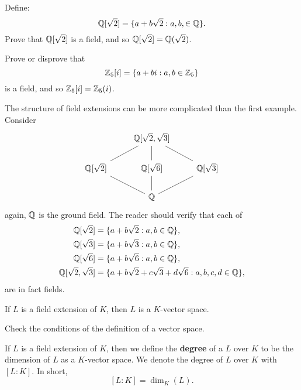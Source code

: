 \documentclass{ximera}
\begin{document}
\begin{exercise}
  Define:
  \[
  \mathbb Q[\sqrt{2}] = \{ a+ b\sqrt{2}: a,b,\in\mathbb Q\}.
  \]
  Prove that $\mathbb Q[\sqrt{2}]$ is a field, and so $\mathbb Q[\sqrt{2}] = \mathbb Q(\sqrt{2})$.
\end{exercise}

\begin{exercise}
  Prove or disprove that
  \[
  \mathbb Z_5[i] = \{a + b i: a,b\in\mathbb Z_5\}
  \]
  is a field, and so $\mathbb Z_5[i] = \mathbb Z_5(i)$.
\end{exercise}


\begin{example}
  The structure of field extensions can be more complicated than the
  first example. Consider
  \[
  \begin{tikzcd}
    & \Q[\sqrt{2},\sqrt{3}]\ar[rd,-] \ar[d,-] \ar[ld,-]& \\
    \Q[\sqrt{2}] \ar[rd,-]& \Q[\sqrt{6}] \ar[d,-]& \Q[\sqrt{3}]\ar[ld,-]\\
    &  \Q & 
  \end{tikzcd}
  \]
  again, $\mathbb Q$ is the ground field.  The reader should verify that each
  of
  \begin{align*}
    \mathbb Q[\sqrt{2}] &=\{a + b\sqrt{2}: a,b\in \mathbb Q\},\\
    \mathbb Q[\sqrt{3}] &=\{a + b\sqrt{3}: a,b\in \mathbb Q\},\\
    \mathbb Q[\sqrt{6}] &=\{a + b\sqrt{6}: a,b\in \mathbb Q\},\\
    \mathbb Q[\sqrt{2},\sqrt{3}] &=\{a + b\sqrt{2} + c\sqrt{3} + d\sqrt{6}: a,b,c,d\in \mathbb Q\},
  \end{align*}
  are in fact fields.
\end{example}



\begin{lemma}\label{L:fevs}
  If $L$ is a field extension of $K$, then $L$ is a $K$-vector space.
  \begin{sketch}
    Check the conditions of the definition of a vector space.
  \end{sketch}
\end{lemma}

\begin{definition}
  If $L$ is a field extension of $K$, then we define the
  \textbf{degree} of a $L$ over $K$ to be the dimension of $L$ as a
  $K$-vector space. We denote the degree of $L$ over $K$ with
  $[L:K]$. In short,
  \[
  [L:K] = \dim_K(L).
  \]
\end{definition}
\end{document}
